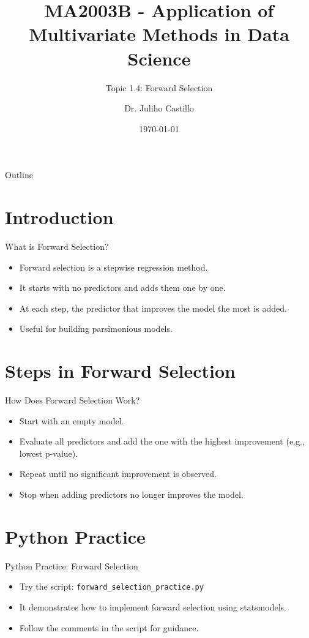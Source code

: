 \documentclass[aspectratio=169]{beamer}
\title[Forward Selection]{MA2003B - Application of Multivariate Methods in Data Science}
\subtitle{Topic 1.4: Forward Selection}
\author{Dr. Juliho Castillo}
\institute{Tec de Monterrey}
\date{\today}
\begin{document}
\begin{frame}
  \titlepage
\end{frame}

\begin{frame}{Outline}
  \tableofcontents
\end{frame}

\section{Introduction}
\begin{frame}{What is Forward Selection?}
  \begin{itemize}
    \item Forward selection is a stepwise regression method.
    \item It starts with no predictors and adds them one by one.
    \item At each step, the predictor that improves the model the most is added.
    \item Useful for building parsimonious models.
  \end{itemize}
\end{frame}

\section{Steps in Forward Selection}
\begin{frame}{How Does Forward Selection Work?}
  \begin{itemize}
    \item Start with an empty model.
    \item Evaluate all predictors and add the one with the highest improvement (e.g., lowest p-value).
    \item Repeat until no significant improvement is observed.
    \item Stop when adding predictors no longer improves the model.
  \end{itemize}
\end{frame}

\section{Python Practice}
\begin{frame}{Python Practice: Forward Selection}
  \begin{itemize}
    \item Try the script: \texttt{forward\_selection\_practice.py}
    \item It demonstrates how to implement forward selection using statsmodels.
    \item Follow the comments in the script for guidance.
  \end{itemize}
\end{frame}
\end{document}
